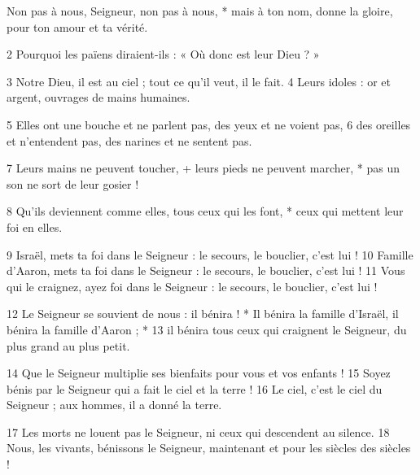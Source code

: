 Non pas à nous, Seigneur, non pas à nous, *
mais à ton nom, donne la gloire,
pour ton amour et ta vérité.

2 Pourquoi les païens diraient-ils :
« Où donc est leur Dieu ? »

3 Notre Dieu, il est au ciel ;
tout ce qu'il veut, il le fait.
4 Leurs idoles : or et argent,
ouvrages de mains humaines.

5 Elles ont une bouche et ne parlent pas,
des yeux et ne voient pas,
6 des oreilles et n'entendent pas,
des narines et ne sentent pas.

7 Leurs mains ne peuvent toucher, +
leurs pieds ne peuvent marcher, *
pas un son ne sort de leur gosier !

8 Qu'ils deviennent comme elles,
tous ceux qui les font, *
ceux qui mettent leur foi en elles.

9 Israël, mets ta foi dans le Seigneur :
le secours, le bouclier, c'est lui !
10 Famille d'Aaron, mets ta foi dans le Seigneur :
le secours, le bouclier, c'est lui !
11 Vous qui le craignez, ayez foi dans le Seigneur :
le secours, le bouclier, c'est lui !

12 Le Seigneur se souvient de nous : il bénira ! *
Il bénira la famille d'Israël,
il bénira la famille d'Aaron ; *
13 il bénira tous ceux qui craignent le Seigneur,
du plus grand au plus petit.

14 Que le Seigneur multiplie ses bienfaits
pour vous et vos enfants !
15 Soyez bénis par le Seigneur
qui a fait le ciel et la terre !
16 Le ciel, c'est le ciel du Seigneur ;
aux hommes, il a donné la terre.

17 Les morts ne louent pas le Seigneur,
ni ceux qui descendent au silence.
18 Nous, les vivants, bénissons le Seigneur,
maintenant et pour les siècles des siècles !